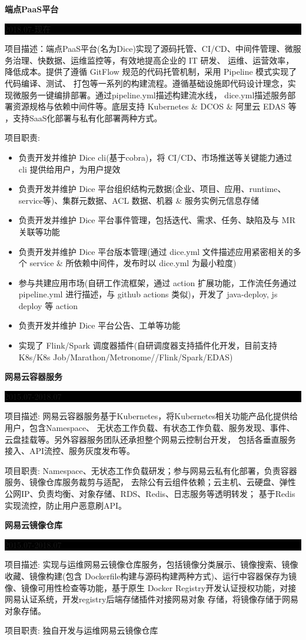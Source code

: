 \documentclass[paper=a4,fontsize=11pt]{scrartcl} %
\newcommand{\sepspace}{\vspace*{1em}}		%
\newcommand{\SubSection}[2]{
	\sepspace \noindent \textbf{#1} \hfill      %
	\colorbox{Black}{\parbox{7em}{\hfill\color{White}#2}} \par  %
	\normalsize \par \sepspace}
\begin{document}
\begin{CJK}{UTF8}{gbsn}
\SubSection{端点PaaS平台}{2018.07-现在}
项目描述：端点PaaS平台(名为Dice)实现了源码托管、CI/CD、中间件管理、微服务治理、快数据、运维监控等，有效地提高企业的 IT 研发、
运维、运营效率，降低成本。提供了遵循 GitFlow 规范的代码托管机制，采用 Pipeline 模式实现了代码编译、测试、
打包等一系列的构建流程。遵循基础设施即代码设计理念，实现微服务一键编排部署。通过pipeline.yml描述构建流水线，
dice.yml描述服务部署资源规格与依赖中间件等。底层支持 Kubernetes \& DCOS \& 阿里云 EDAS 等 ，支持SaaS化部署与私有化部署两种方式。\par
\sepspace
项目职责:  
\begin{itemize}
\item 负责开发并维护 Dice cli(基于cobra)，将 CI/CD、市场推送等关键能力通过 cli 提供给用户，为用户提效
\item 负责开发并维护 Dice 平台组织结构元数据(企业、项目、应用、runtime、service等)、集群元数据、ACL 数据、机器 \& 服务实例元信息存储
\item 负责开发并维护 Dice 平台事件管理，包括迭代、需求、任务、缺陷及与 MR 关联等功能
\item 负责开发并维护 Dice 平台版本管理(通过 dice.yml 文件描述应用紧密相关的多个 service \& 所依赖中间件，发布时以 dice.yml 为最小粒度)
\item 参与共建应用市场(自研工作流框架，通过 action 扩展功能，工作流任务通过 pipeline.yml 进行描述，与 github actions 类似)，开发了 java-deploy, js deploy 等 action
\item 负责开发并维护 Dice 平台公告、工单等功能
\item 实现了 Flink/Spark 调度器插件(自研调度器支持插件化开发，目前支持K8s/K8s Job/Marathon/Metronome//Flink/Spark/EDAS)
\end{itemize}

\SubSection{网易云容器服务}{2015.07-2018.07}
项目描述: 网易云容器服务基于Kubernetes，将Kubernetes相关功能产品化提供给用户，包含Namespace、
无状态工作负载、有状态工作负载、服务发现、事件、云盘挂载等。另外容器服务团队还承担整个网易云控制台开发，
包括各垂直服务接入、API流控、服务灰度发布等。\par
\sepspace
项目职责: Namespace、无状态工作负载研发；参与网易云私有化部署，负责容器服务、镜像仓库服务裁剪与适配，
去除公有云组件依赖；云主机、云硬盘、弹性公网IP、负责均衡、对象存储、RDS、Redis、日志服务等透明转发；
基于Redis实现流控，防止用户恶意刷API。

\SubSection{网易云镜像仓库}{2015.07-2018.07}
项目描述: 实现与运维网易云镜像仓库服务，包括镜像分类展示、镜像搜索、镜像收藏、镜像构建(包含
Dockerfile构建与源码构建两种方式)、运行中容器保存为镜像、镜像可用性检查等功能，基于原生
Docker Registry开发认证授权功能，对接网易认证系统，开发registry后端存储插件对接网易对象
存储，将镜像存储于网易对象存储。\par
\sepspace
项目职责: 独自开发与运维网易云镜像仓库


\end{CJK}
\end{document}
